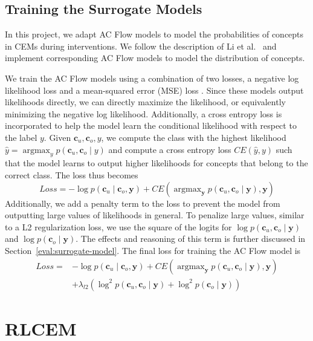 \documentclass[../main.tex]{subfiles}
\begin{document}
\subsection{Training the Surrogate Models}\label{method:training-surrogate-model}

In this project, we adapt AC Flow models to model the probabilities of concepts in CEMs during interventions.
We follow the description of Li et al.~\cite{afa} and implement corresponding AC Flow models to model
the distribution of concepts.

We train the AC Flow models using a combination of two losses, a negative
log likelihood loss and a mean-squared error (MSE) loss . 
Since these models output likelihoods directly,
we can directly maximize the likelihood, or equivalently minimizing the negative log likelihood.
Additionally, a cross entropy loss is incorporated to help the model
learn the conditional likelihood with respect to the label $y$. 
Given $\mathbf{c}_u, \mathbf{c}_o, y$, we compute the class with the highest likelihood
$\hat{y} = \mathop{\mathrm{argmax}}_y p(\mathbf{c}_u, \mathbf{c}_o \mid y)$ and compute 
a cross entropy loss $CE(\hat{y}, y)$ such that the model learns to 
output higher likelihoods for concepts that belong to the correct class.
The loss thus becomes
\[Loss = - \log p(\mathbf{c}_u \mid \mathbf{c}_o, \mathbf{y}) +
 CE(\mathop{\mathrm{argmax}}_\mathbf{y} p(\mathbf{c}_u, \mathbf{c}_o \mid \mathbf{y}),  \mathbf{y})
\]
Additionally, we add a penalty term to the loss to prevent 
the model from outputting large values of likelihoods in general.
To penalize
large values, similar to a L2 regularization loss,
we use the square of the logits for $\log p(\mathbf{c}_u, \mathbf{c}_o \mid \mathbf{y})$ and 
$\log p(\mathbf{c}_o \mid \mathbf{y})$. The effects and reasoning of this term is further discussed in 
Section~\ref{eval:surrogate-model}. The final loss for training the
AC Flow model is
\begin{align*} 
Loss = & - \log p(\mathbf{c}_u \mid \mathbf{c}_o, \mathbf{y}) + 
CE(\mathop{\mathrm{argmax}}_\mathbf{y} p(\mathbf{c}_u, \mathbf{c}_o \mid \mathbf{y}),  \mathbf{y})
\\ & + \lambda_{l2} \left ( \log^2 p(\mathbf{c}_u, \mathbf{c}_o \mid \mathbf{y}) + 
\log^2 p(\mathbf{c}_o \mid \mathbf{y}) \right )
\end{align*}


\section{RLCEM}\label{method:rlcem}
\end{document}
